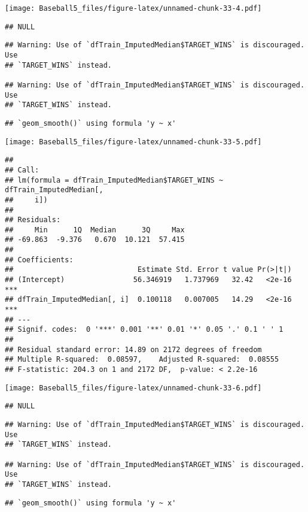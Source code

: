 \documentclass[
]{article}
\begin{document}
\texttt{[image: Baseball5\_files/figure-latex/unnamed-chunk-33-4.pdf]}

\begin{verbatim}
## NULL
\end{verbatim}

\begin{verbatim}
## Warning: Use of `dfTrain_ImputedMedian$TARGET_WINS` is discouraged. Use
## `TARGET_WINS` instead.

## Warning: Use of `dfTrain_ImputedMedian$TARGET_WINS` is discouraged. Use
## `TARGET_WINS` instead.
\end{verbatim}

\begin{verbatim}
## `geom_smooth()` using formula 'y ~ x'
\end{verbatim}

\texttt{[image: Baseball5\_files/figure-latex/unnamed-chunk-33-5.pdf]}

\begin{verbatim}
## 
## Call:
## lm(formula = dfTrain_ImputedMedian$TARGET_WINS ~ dfTrain_ImputedMedian[, 
##     i])
## 
## Residuals:
##     Min      1Q  Median      3Q     Max 
## -69.863  -9.376   0.670  10.121  57.415 
## 
## Coefficients:
##                             Estimate Std. Error t value Pr(>|t|)    
## (Intercept)                56.346919   1.737969   32.42   <2e-16 ***
## dfTrain_ImputedMedian[, i]  0.100118   0.007005   14.29   <2e-16 ***
## ---
## Signif. codes:  0 '***' 0.001 '**' 0.01 '*' 0.05 '.' 0.1 ' ' 1
## 
## Residual standard error: 14.89 on 2172 degrees of freedom
## Multiple R-squared:  0.08597,    Adjusted R-squared:  0.08555 
## F-statistic: 204.3 on 1 and 2172 DF,  p-value: < 2.2e-16
\end{verbatim}

\texttt{[image: Baseball5\_files/figure-latex/unnamed-chunk-33-6.pdf]}

\begin{verbatim}
## NULL
\end{verbatim}

\begin{verbatim}
## Warning: Use of `dfTrain_ImputedMedian$TARGET_WINS` is discouraged. Use
## `TARGET_WINS` instead.

## Warning: Use of `dfTrain_ImputedMedian$TARGET_WINS` is discouraged. Use
## `TARGET_WINS` instead.
\end{verbatim}

\begin{verbatim}
## `geom_smooth()` using formula 'y ~ x'
\end{verbatim}
\end{document}

